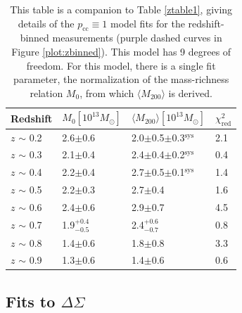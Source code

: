 \begin{landscape}
\begin{table}
\centering
    \caption[Shear Results for Redshift-Binned Clusters (Perfectly Centred Model)]{This table is a companion to Table \ref{ztable1}, giving details of the $p_{\mathrm{cc}} \equiv 1$ model fits for the redshift-binned measurements (purple dashed curves in Figure \ref{plot:zbinned}). This model has 9 degrees of freedom. For this model, there is a single fit parameter, the normalization of the mass-richness relation $M_0$, from which $\langle M_{200} \rangle$ is derived.}
    \begin{tabular}{llll}
      \hline
      Redshift & $M_0 \left[ 10^{13} M_{\odot}\right]$ & $\langle M_{200} \rangle \left[ 10^{13} M_{\odot}\right]$ & $\chi^2_{\mathrm{red}}$ \\ \hline
      $z$ $\sim$ 0.2 & 2.6$\pm$0.6 & 2.0$\pm$0.5$\pm$0.3$^{\mathrm{sys}}$ & 2.1  \\
      $z$ $\sim$ 0.3 & 2.1$\pm$0.4 & 2.4$\pm$0.4$\pm$0.2$^{\mathrm{sys}}$ & 0.4  \\
      $z$ $\sim$ 0.4 & 2.2$\pm$0.4 & 2.7$\pm$0.5$\pm$0.1$^{\mathrm{sys}}$ & 1.4  \\
      $z$ $\sim$ 0.5 & 2.2$\pm$0.3 & 2.7$\pm$0.4 & 1.6  \\
      $z$ $\sim$ 0.6 & 2.4$\pm$0.6 & 2.9$\pm$0.7 & 4.5  \\
      $z$ $\sim$ 0.7 & 1.9$^{+0.4}_{-0.5}$ & 2.4$^{+0.6}_{-0.7}$ & 0.8  \\
      $z$ $\sim$ 0.8 & 1.4$\pm$0.6 & 1.8$\pm$0.8 & 3.3  \\ 
      $z$ $\sim$ 0.9 & 1.3$\pm$0.6 & 1.4$\pm$0.6 & 0.6  \\
      \hline
    \end{tabular}
    \label{ztable2}
\end{table}

\end{landscape}

\subsection{Fits to $\Delta\Sigma$}
\label{fits}

